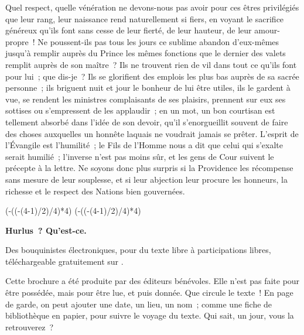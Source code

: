 \documentclass[french,twoside]{book} %
\def\truncdiv#1#2{((#1-(#2-1)/2)/#2)}
\def\moduloop#1#2{(#1-\truncdiv{#1}{#2}*#2)}
\def\modulo#1#2{\number\numexpr\moduloop{#1}{#2}\relax}
\begin{document}
Quel respect, quelle vénération ne devons-nous pas avoir pour ces êtres privilégiés que leur rang, leur naissance rend naturellement si fiers, en voyant le sacrifice généreux qu’ils font sans cesse de leur fierté, de leur hauteur, de leur amour-propre ! Ne poussent-ils pas tous les jours ce sublime abandon d’eux-mêmes jusqu’à remplir auprès du Prince les mêmes fonctions que le dernier des valets remplit auprès de son maître ? Ils ne trouvent rien de vil dans tout ce qu’ils font pour lui ; que dis-je ? Ils se glorifient des emplois les plus bas auprès de sa sacrée personne ; ils briguent nuit et jour le bonheur de lui être utiles, ils le gardent à vue, se rendent les ministres complaisants de ses plaisirs, prennent sur eux ses sottises ou s’empressent de les applaudir ; en un mot, un bon courtisan est tellement absorbé dans l’idée de son devoir, qu’il s’enorgueillit souvent de faire des choses auxquelles un honnête laquais ne voudrait jamais se prêter. L’esprit de l’Évangile est l’humilité ; le Fils de l’Homme nous a dit que celui qui s’exalte serait humilié ; l’inverse n’est pas moins sûr, et les gens de Cour suivent le précepte à la lettre. Ne soyons donc plus surpris si la Providence les récompense sans mesure de leur souplesse, et si leur abjection leur procure les honneurs, la richesse et le respect des Nations bien gouvernées.\par
\bigbreak
 


\ifbooklet
  \pagestyle{empty}
  \clearpage
  \ifnum\modulo{\value{page}}{4}=0 \hbox{}\newpage\hbox{}\newpage\fi
  \ifnum\modulo{\value{page}}{4}=1 \hbox{}\newpage\hbox{}\newpage\fi


  \hbox{}\newpage
  \ifodd\value{page}\hbox{}\newpage\fi
  {\centering\color{rubric}\bfseries\noindent\large
    Hurlus ? Qu’est-ce.\par
    \bigskip
  }
  \noindent Des bouquinistes électroniques, pour du texte libre à participations libres,
  téléchargeable gratuitement sur \href{https://hurlus.fr}{}.\par
  \bigskip
  \noindent Cette brochure a été produite par des éditeurs bénévoles.
  Elle n’est pas faite pour être possédée, mais pour être lue, et puis donnée.
  Que circule le texte !
  En page de garde, on peut ajouter une date, un lieu, un nom ;
  comme une fiche de bibliothèque en papier,
  pour suivre le voyage du texte. Qui sait, un jour, vous la retrouverez ?
  \par
\end{document}
